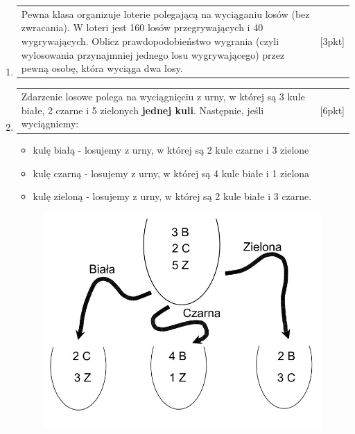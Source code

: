 \documentclass[12pt,a4paper]{article}
\begin{document}
\begin{enumerate}[1.]
		
		
		\item \begin{tabular}{p{13cm} r}
			Pewna klasa organizuje loterie polegającą na wyciąganiu losów (bez zwracania). W loteri jest 160 losów przegrywających i 40 wygrywających. Oblicz prawdopodobieństwo wygrania (czyli wylosowania przynajmniej jednego losu wygrywającego) przez pewną osobę, która wyciąga dwa losy.	  &[3pkt]\\ 
		\end{tabular}
		
		\item \begin{tabular}{p{13cm} r}
			Zdarzenie losowe polega na wyciągnięciu z urny, w której są 3 kule białe, 2 czarne i 5 zielonych \textbf{jednej kuli}. Następnie, jeśli wyciągniemy:	  &[6pkt]\\ 
		\end{tabular}
		
		\begin{itemize}
			\item kulę białą - losujemy z urny, w której są 2 kule czarne i 3 zielone
			\item kulę czarną - losujemy z urny, w której są 4 kule białe i 1 zielona
			\item kulę zieloną - losujemy z urny, w której są 2 kule białe i 3 czarne.
		\end{itemize}
		
		\begin{figure}[h]
			\centering
			\includegraphics[scale=0.4]{rpt1.jpeg}
		\end{figure}
		

\end{enumerate}
\end{document}
